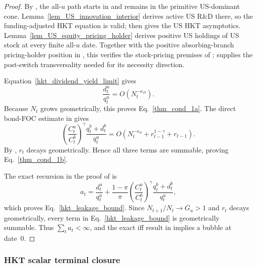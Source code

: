 \documentclass{article}
\def\green#1{#1}%
\begin{document}
\begin{proof}
\green{By }, \green{the all-}$\green{u}$ \green{path starts in and remains in the primitive US-dominant cone}.  \green{Lemma}~\green{\ref{lem_US_innovation_interior} derives active US R}\&\green{D there}, \green{so the funding-adjusted HKT equation is valid}; \green{ then gives the US HKT asymptotics}.  \green{Lemma}~\green{\ref{lem_US_equity_pricing_holder} derives positive US holdings of US stock at every finite all-}$\green{u}$ \green{date}.  \green{Together with the positive absorbing-branch pricing-holder position in }, \green{this verifies the stock-pricing premises of }; \green{ supplies the post-switch transversality needed for its necessity direction}.

Equation~\eqref{hkt_dividend_yield_limit} gives
\[
\frac{d_t^u}{q_t^u}=O(N_t^{-\kappa_D}).
\]
\green{Because} $\green{N}_\green{t}$ \green{grows geometrically}, \green{this proves Eq}.~\green{\eqref{thm_cond_1a}}.  \green{The direct bond-FOC estimate in \Cref{lem_direct_switch_leakage} gives}
\[
\left(\frac{C_t^u}{C_t^b}\right)^\gamma
\frac{q_t^b+d_t^b}{q_t^u}
=
O\left(
N_t^{-\kappa_S}
\green{+r}_{\green{t-1}}^{\green{1-\gamma}}
\green{+r}_{\green{t-1}}
\right).
\]
\green{By }, $\green{r}_\green{t}$ \green{decays geometrically}.  \green{Hence all three terms are summable}, \green{proving Eq}.~\green{\eqref{thm_cond_1b}}.

The exact recursion in the proof of  is
\[
a_t
=
\frac{d_t^u}{q_t^u}
+\frac{1-\pi}{\pi}
\left(\frac{C_t^u}{C_t^b}\right)^\gamma
\frac{q_t^b+d_t^b}{q_t^u},
\]
which proves Eq.~\eqref{hkt_leakage_bound}.  Since $N_{t+1}/N_t\to G_u>1$ \green{and} $\green{r}_\green{t}$ \green{decays geometrically}, \green{every term} in Eq.~\eqref{hkt_leakage_bound} \green{is} geometrically summable.  Thus $\sum_ta_t<\infty$, and \green{the exact iff result in}  implies a bubble at date~0.
\end{proof}

\subsubsection{HKT scalar terminal closure}
\end{document}
